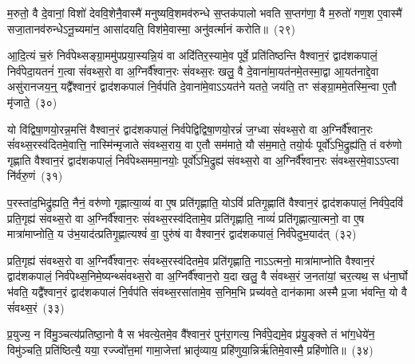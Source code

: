 म॒रुतो॒ वै दे॒वानां॒ विशो॑ देववि॒शेनै॒वास्मै॑ मनुष्यवि॒शमव॑\-रुन्धे स॒प्तक॑पालो भवति स॒प्तग॑णा॒ वै म॒रुतो॑ गण॒श ए॒वास्मै॑ सजा॒तानव॑\-रुन्धे\-ऽनू॒च्यमा॑न॒ आसा॑दयति॒ विश॑मे॒वास्मा॒ अनु॑वर्त्मानं करोति॥~(२९)\ip

{\anuvakamend[{प्र॒जाका॑मः संवथ्स॒रः पु॒नात्ये॒वैनं॑ पू॒तः सम॑ष्ट्यै ता॒दृङ्मा॑रु॒तो भ॑व॒त्येका॒न्नत्रि॒ꣳ॒शच्च॑}]}

आ॒दि॒त्यं च॒रुं निर्व॑पेथ्सङ्ग्रा॒ममु॑पप्रया॒स्यन्नि॒यं वा अदि॑तिर॒स्या\-मे॒व पूर्वे॒ प्रति॑तिष्ठन्ति वैश्वान॒रं द्वाद॑श\-कपालं॒ निर्व॑पेदा॒यतनं॑ ग॒त्वा सं॑वथ्स॒रो वा अ॒ग्निर्वै᳚श्वान॒रः सं॑वथ्स॒रः खलु॒ वै दे॒वाना॑मा॒यत॑नमे॒तस्मा॒द्वा आ॒यत॑नाद्दे॒वा असु॑रानजय॒न्॒ यद्वै᳚श्वान॒रं द्वाद॑श\-कपालं नि॒र्वप॑ति दे॒वाना॑\-मे॒वा\-ऽऽ\-\-यत॑ने यतते॒ जय॑ति॒ तꣳ स॑ङ्ग्रा॒ममे॒तस्मि॒न्वा ए॒तौ मृ॑जाते॒~(३०)\ip

यो वि॑द्विषा॒णयो॒रन्न॒मत्ति॑ वैश्वान॒रं द्वाद॑श\-कपालं॒ निर्व॑पेद्विद्विषा॒\-णयो॒रन्नं॑ ज॒ग्ध्वा सं॑वथ्स॒रो वा अ॒ग्निर्वै᳚श्वान॒रः सं॑वथ्स॒रस्व॑दितमे॒वात्ति॒ नास्मि॑न्मृजाते संवथ्स॒राय॒ वा ए॒तौ सम॑माते॒ यौ स॑म॒माते॒ तयो॒र्यः पूर्वो॑\-ऽभि॒द्रुह्य॑ति॒ तं वरु॑णो गृह्णाति वैश्वान॒रं द्वाद॑श\-कपालं॒ निर्व॑पेथ्सममा॒नयोः॒ पूर्वो॑\-ऽभि॒द्रुह्य॑ संवथ्स॒रो वा अ॒ग्निर्वै᳚श्वान॒रः सं॑वथ्स॒रमे॒वा\-ऽऽ\-प्त्वा नि॑र्वरु॒णं~(३१)\ip

प॒रस्ता॑द॒भिद्रु॑ह्यति॒ नैनं॒ वरु॑णो गृह्णात्या॒व्यं॑ वा ए॒ष प्रति॑गृह्णाति॒ यो\-ऽविं॑ प्रतिगृ॒ह्णाति॑ वैश्वान॒रं द्वाद॑श\-कपालं॒ निर्व॑पे॒दविं॑ प्रति॒गृह्य॑ संवथ्स॒रो वा अ॒ग्निर्वै᳚श्वान॒रः सं॑वथ्स॒रस्व॑दितामे॒व प्रति॑गृह्णाति॒ नाव्यं॑ प्रति॑\-गृह्णात्या॒त्मनो॒ वा ए॒ष मात्रा॑माप्नोति॒ य उ॑भ॒याद॑त्प्रतिगृ॒ह्णात्यश्वं॑ वा॒ पुरु॑षं वा वैश्वान॒रं द्वाद॑श\-कपालं॒ निर्व॑पेदुभ॒याद॑त्~(३२)\ip

प्रति॒गृह्य॑ संवथ्स॒रो वा अ॒ग्निर्वै᳚श्वान॒रः सं॑वथ्स॒रस्व॑दितमे॒व प्रति॑गृह्णाति॒ ना\-ऽऽ\-त्मनो॒ मात्रा॑माप्नोति वैश्वान॒रं द्वाद॑श\-कपालं॒ निर्व॑पेथ्स॒निमे॒ष्यन्थ्सं॑वथ्स॒रो वा अ॒ग्निर्वै᳚श्वान॒रो य॒दा खलु॒ वै सं॑वथ्स॒रं ज॒नता॑यां॒ चर॒त्यथ॒ स ध॑ना॒र्घो भ॑वति॒ यद्वै᳚श्वान॒रं द्वाद॑श\-कपालं नि॒र्वप॑ति संवथ्स॒रसा॑तामे॒व स॒निम॒भि प्रच्य॑वते॒ दान॑कामा अस्मै प्र॒जा भ॑वन्ति॒ यो वै सं॑वथ्स॒रं~(३३)\ip

प्र॒युज्य॒ न वि॑मु॒ञ्चत्य॑प्रतिष्ठा॒नो वै स भ॑वत्ये॒तमे॒व वै᳚श्वान॒रं पुन॑रा॒गत्य॒ निर्व॑पे॒द्यमे॒व प्र॑यु॒ङ्क्ते तं भा॑ग॒धेये॑न॒ विमु॑ञ्चति॒ प्रति॑ष्ठित्यै॒ यया॒ रज्ज्वो᳚त्त॒मां गामा॒जेत्तां भ्रातृ॑व्याय॒ प्रहि॑णुया॒न्निर्\mbox{}ऋ॑तिमे॒वास्मै॒ प्रहि॑णोति॥~(३४)\ip

{\anuvakamend[{नि॒र्व॒रु॒णं व॑पेदुभ॒याद॒द्यो वै सं॑वथ्स॒रꣳ षट्त्रिꣳ॑शच्च।}]}

